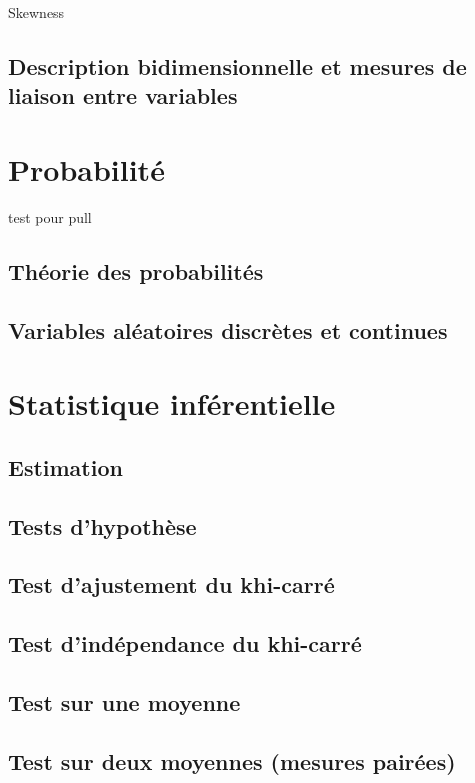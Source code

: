 \documentclass{report}
\begin{document}
Skewness

\section{Description bidimensionnelle et mesures de liaison entre variables}

\chapter{Probabilité}

test pour pull

\section{Théorie des probabilités}

\section{Variables aléatoires discrètes et continues}

\chapter{Statistique inférentielle}

\section{Estimation}

\section{Tests d’hypothèse}

\section{Test d’ajustement du khi-carré}

\section{Test d’indépendance du khi-carré}

\section{Test sur une moyenne}

\section{Test sur deux moyennes (mesures pairées)}
\end{document}
